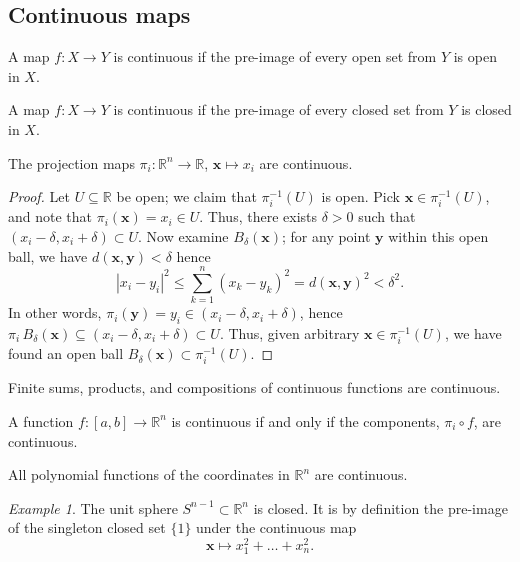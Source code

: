 \documentclass[11pt]{article}
\newcommand{\R}{\mathbb{R}}
\renewcommand{\vec}[1]{\boldsymbol{#1}}
\newcommand{\vx}{\vec{x}}
\newcommand{\vy}{\vec{y}}
\theoremstyle{definition}
\theoremstyle{remark}
\newtheorem*{example}{Example}
\numberwithin{equation}{section}
\begin{document}
    \subsection{Continuous maps}
    \begin{definition}
        A map $f\colon X \to Y$ is continuous if the pre-image of every open set from
        $Y$ is open in $X$.
    \end{definition}
    \begin{lemma}
        A map $f\colon X \to Y$ is continuous if the pre-image of every closed set from
        $Y$ is closed in $X$.
    \end{lemma}

    \begin{theorem}
        The projection maps $\pi_i\colon \R^n \to \R$, $\vx \mapsto x_i$ are continuous.
    \end{theorem}
    \begin{proof}
        Let $U \subseteq \R$ be open; we claim that $\pi_i^{-1}(U)$ is open. Pick
        $\vx \in \pi_i^{-1}(U)$, and note that $\pi_i(\vx) = x_i \in U$. Thus, there
        exists $\delta > 0$ such that $(x_i - \delta, x_i + \delta) \subset U$. Now
        examine $B_\delta(\vx)$; for any point $\vy$ within this open ball, we have
        $d(\vx, \vy) < \delta$ hence \[
            |x_i - y_i|^2 \leq \sum_{k = 1}^n (x_k - y_k)^2 = d(\vx, \vy)^2 <
            \delta^2.
        \] In other words, $\pi_i(\vy) = y_i \in (x_i - \delta, x_i + \delta)$, hence
        $\pi_i \,B_\delta(\vx) \subseteq (x_i - \delta, x_i + \delta) \subset
        U$. Thus, given arbitrary $\vx \in \pi_i^{-1}(U)$, we have found an open ball
        $B_\delta(\vx) \subset \pi_i^{-1}(U)$.
    \end{proof}

    \begin{lemma}
        Finite sums, products, and compositions of continuous functions are continuous.
    \end{lemma}
    \begin{corollary}
        A function $f\colon [a, b] \to \R^n$ is continuous if and only if the
        components, $\pi_i \circ f$, are continuous.
    \end{corollary}

    \begin{theorem}
        All polynomial functions of the coordinates in $\R^n$ are continuous.
    \end{theorem}
    \begin{example}
        The unit sphere $S^{n - 1} \subset \R^n$ is closed. It is by definition the
        pre-image of the singleton closed set $\{1\}$ under the continuous map \[
            \vx \mapsto x_1^2 + \dots + x_n^2.
        \] 
    \end{example}
    
\end{document}
